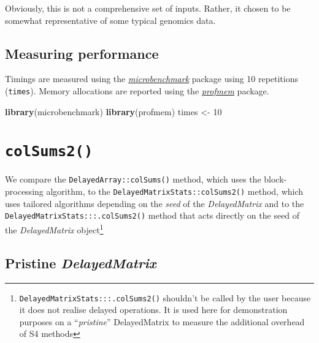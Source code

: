 \documentclass[]{book}
\newenvironment{Shaded}{\begin{snugshade}}{\end{snugshade}}
\newcommand{\KeywordTok}[1]{\textcolor[rgb]{0.13,0.29,0.53}{\textbf{#1}}}
\newcommand{\DecValTok}[1]{\textcolor[rgb]{0.00,0.00,0.81}{#1}}
\newcommand{\StringTok}[1]{\textcolor[rgb]{0.31,0.60,0.02}{#1}}
\newcommand{\NormalTok}[1]{#1}
\let\rmarkdownfootnote\footnote%
\def\footnote{\protect\rmarkdownfootnote}
\begin{document}
Obviously, this is not a comprehensive set of inputs. Rather, it chosen
to be somewhat representative of some typical genomics data.

\section{Measuring performance}\label{measuring-performance}

Timings are measured using the
\emph{\href{https://CRAN.R-project.org/package=microbenchmark}{microbenchmark}}
package using 10 repetitions (\texttt{times}). Memory allocations are
reported using the
\emph{\href{https://CRAN.R-project.org/package=profmem}{profmem}}
package.

\begin{Shaded}
\begin{Highlighting}[]
\KeywordTok{library}\NormalTok{(microbenchmark)}
\KeywordTok{library}\NormalTok{(profmem)}
\NormalTok{times <-}\StringTok{ }\DecValTok{10}
\end{Highlighting}
\end{Shaded}

\chapter{\texorpdfstring{\texttt{colSums2()}}{colSums2()}}\label{colsums2}

We compare the \texttt{DelayedArray::colSums()} method, which uses the
block-processing algorithm, to the
\texttt{DelayedMatrixStats::colSums2()} method, which uses tailored
algorithms depending on the \emph{seed} of the \emph{DelayedMatrix} and
to the \texttt{DelayedMatrixStats:::.colSums2()} method that acts
directly on the seed of the \emph{DelayedMatrix} object\footnote{\texttt{DelayedMatrixStats:::.colSums2()}
  shouldn't be called by the user because it does not realise delayed
  operations. It is used here for demonstration purposes on a
  ``\emph{pristine}'' DelayedMatrix to measure the additional overhead
  of S4 methods}

\section{\texorpdfstring{Pristine
\emph{DelayedMatrix}}{Pristine DelayedMatrix}}\label{pristine-delayedmatrix}
\end{document}
